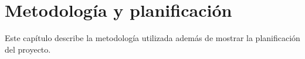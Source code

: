 \chapter{Metodología y planificación}
 Este capítulo describe la metodología utilizada además de mostrar la planificación del proyecto.
 

